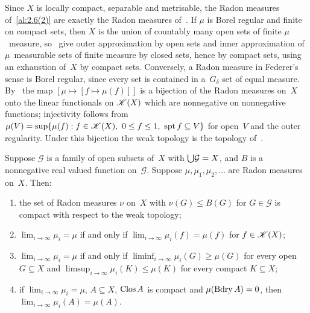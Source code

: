 \begin{remark}
    \label{rem:2.6(2)}
    Since $X$ is locally compact, separable and metrisable, the Radon measures of~\ref{al:2.6(2)}
    are exactly the Radon measures of~\cite[2.2.5]{Federer1969}. If $\mu$ is Borel regular and
    finite on compact sets, then $X$ is the union of countably many open sets of finite
    $\mu$~measure, so~\cite[2.2.2, 2.2.3]{Federer1969} give outer approximation by open sets and
    inner approximation of $\mu$~measurable sets of finite measure by closed sets, hence by
    compact sets, using an exhaustion of~$X$ by compact sets. Conversely, a Radon measure in
    Federer's sense is Borel regular, since every set is contained in a~$G_\delta$ set of equal
    measure. By~\cite[2.5.13, 2.5.14]{Federer1969} the map $[\mu \mapsto [f \mapsto \mu(f)]]$ is
    a bijection of the Radon measures on~$X$ onto the linear functionals on $\mathscr{K}(X)$ which
    are nonnegative on nonnegative functions; injectivity follows from $\mu(V) = \sup \{ \mu(f) :
    f \in \mathscr{K}(X),\ 0 \le f \le 1,\ \operatorname{spt} f \subseteq V \}$ for open~$V$ and the outer
    regularity. Under this bijection the weak topology is the topology of~\cite[2.5.19]{Federer1969}.
\end{remark}

\begin{lemma}
    \label{al:2.6(2)(a)}
    Suppose $\mathcal{G}$ is a family of open subsets of~$X$ with ${{\textstyle \bigcup}} \mathcal{G} = X$, and
    $B$ is a nonnegative real valued function on~$\mathcal{G}$. Suppose $\mu, \mu_1, \mu_2,
    \ldots$ are Radon measures on~$X$. Then:
    \begin{enumerate}
        \item the set of Radon measures $\nu$ on~$X$ with $\nu(G) \le B(G)$ for $G \in
            \mathcal{G}$ is compact with respect to the weak topology;
        \item $\lim_{i \to \infty} \mu_i = \mu$ if and only if $\lim_{i \to \infty} \mu_i(f) =
            \mu(f)$ for $f \in \mathscr{K}(X)$;
        \item $\lim_{i \to \infty} \mu_i = \mu$ if and only if $\liminf_{i \to \infty} \mu_i(G)
            \ge \mu(G)$ for every open $G \subseteq X$ and $\limsup_{i \to \infty} \mu_i(K) \le
            \mu(K)$ for every compact $K \subseteq X$;
        \item if $\lim_{i \to \infty} \mu_i = \mu$, $A \subseteq X$, $\mathop{\mathrm{Clos}}A$ is compact and
            $\mu(\operatorname{Bdry} A) = 0$, then $\lim_{i \to \infty} \mu_i(A) = \mu(A)$.
    \end{enumerate}
\end{lemma}

